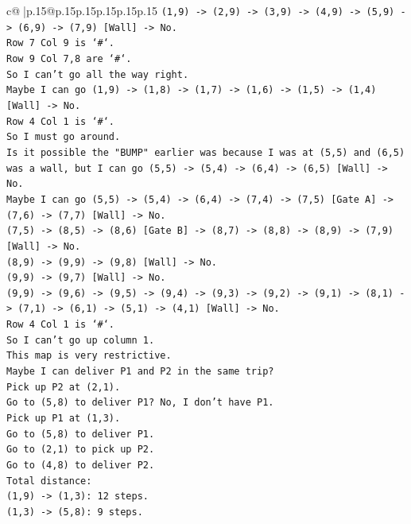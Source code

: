 \documentclass{article}
\begin{document}
{\begin{supertabular}{c@{$\;$}|p{.15\linewidth}@{}p{.15\linewidth}p{.15\linewidth}p{.15\linewidth}p{.15\linewidth}p{.15\linewidth}}
{{{\texttt{(1,9) {-}> (2,9) {-}> (3,9) {-}> (4,9) {-}> (5,9) {-}> (6,9) {-}> (7,9) {[}Wall{]} {-}> No.} \\
\texttt{Row 7 Col 9 is `\#`.} \\
\texttt{Row 9 Col 7,8 are `\#`.} \\
\texttt{So I can't go all the way right.} \\
\texttt{Maybe I can go (1,9) {-}> (1,8) {-}> (1,7) {-}> (1,6) {-}> (1,5) {-}> (1,4) {[}Wall{]} {-}> No.} \\
\texttt{Row 4 Col 1 is `\#`.} \\
\texttt{So I must go around.} \\
\texttt{Is it possible the "BUMP" earlier was because I was at (5,5) and (6,5) was a wall, but I can go (5,5) {-}> (5,4) {-}> (6,4) {-}> (6,5) {[}Wall{]} {-}> No.} \\
\texttt{Maybe I can go (5,5) {-}> (5,4) {-}> (6,4) {-}> (7,4) {-}> (7,5) {[}Gate A{]} {-}> (7,6) {-}> (7,7) {[}Wall{]} {-}> No.} \\
\texttt{(7,5) {-}> (8,5) {-}> (8,6) {[}Gate B{]} {-}> (8,7) {-}> (8,8) {-}> (8,9) {-}> (7,9) {[}Wall{]} {-}> No.} \\
\texttt{(8,9) {-}> (9,9) {-}> (9,8) {[}Wall{]} {-}> No.} \\
\texttt{(9,9) {-}> (9,7) {[}Wall{]} {-}> No.} \\
\texttt{(9,9) {-}> (9,6) {-}> (9,5) {-}> (9,4) {-}> (9,3) {-}> (9,2) {-}> (9,1) {-}> (8,1) {-}> (7,1) {-}> (6,1) {-}> (5,1) {-}> (4,1) {[}Wall{]} {-}> No.} \\
\texttt{Row 4 Col 1 is `\#`.} \\
\texttt{So I can't go up column 1.} \\
\texttt{This map is very restrictive.} \\
\texttt{Maybe I can deliver P1 and P2 in the same trip?} \\
\texttt{Pick up P2 at (2,1).} \\
\texttt{Go to (5,8) to deliver P1? No, I don't have P1.} \\
\texttt{Pick up P1 at (1,3).} \\
\texttt{Go to (5,8) to deliver P1.} \\
\texttt{Go to (2,1) to pick up P2.} \\
\texttt{Go to (4,8) to deliver P2.} \\
\texttt{Total distance:} \\
\texttt{(1,9) {-}> (1,3): 12 steps.} \\
\texttt{(1,3) {-}> (5,8): 9 steps.} \\
}}}
\end{supertabular}}
\end{document}
